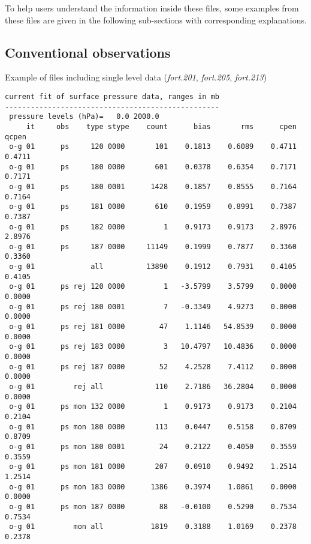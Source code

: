To help users understand the information inside these files, some examples from these files are given in the following sub-sections with corresponding explanations.

\subsection{Conventional observations}
\label{sec4.5.1}

Example of files including single level data (\textit{fort.201}, \textit{fort.205}, \textit{fort.213})

\begin{scriptsize}
\begin{verbatim}
current fit of surface pressure data, ranges in mb
--------------------------------------------------
 pressure levels (hPa)=   0.0 2000.0
     it     obs    type stype    count      bias       rms      cpen     qcpen
 o-g 01      ps     120 0000       101    0.1813    0.6089    0.4711    0.4711
 o-g 01      ps     180 0000       601    0.0378    0.6354    0.7171    0.7171
 o-g 01      ps     180 0001      1428    0.1857    0.8555    0.7164    0.7164
 o-g 01      ps     181 0000       610    0.1959    0.8991    0.7387    0.7387
 o-g 01      ps     182 0000         1    0.9173    0.9173    2.8976    2.8976
 o-g 01      ps     187 0000     11149    0.1999    0.7877    0.3360    0.3360
 o-g 01             all          13890    0.1912    0.7931    0.4105    0.4105
 o-g 01      ps rej 120 0000         1   -3.5799    3.5799    0.0000    0.0000
 o-g 01      ps rej 180 0001         7   -0.3349    4.9273    0.0000    0.0000
 o-g 01      ps rej 181 0000        47    1.1146   54.8539    0.0000    0.0000
 o-g 01      ps rej 183 0000         3   10.4797   10.4836    0.0000    0.0000
 o-g 01      ps rej 187 0000        52    4.2528    7.4112    0.0000    0.0000
 o-g 01         rej all            110    2.7186   36.2804    0.0000    0.0000
 o-g 01      ps mon 132 0000         1    0.9173    0.9173    0.2104    0.2104
 o-g 01      ps mon 180 0000       113    0.0447    0.5158    0.8709    0.8709
 o-g 01      ps mon 180 0001        24    0.2122    0.4050    0.3559    0.3559
 o-g 01      ps mon 181 0000       207    0.0910    0.9492    1.2514    1.2514
 o-g 01      ps mon 183 0000      1386    0.3974    1.0861    0.0000    0.0000
 o-g 01      ps mon 187 0000        88   -0.0100    0.5290    0.7534    0.7534
 o-g 01         mon all           1819    0.3188    1.0169    0.2378    0.2378
\end{verbatim}
\end{scriptsize}

